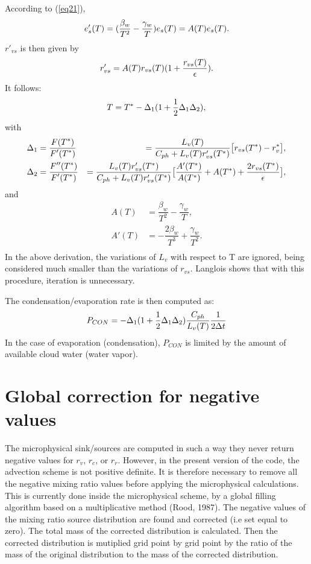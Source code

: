 According to (\ref{eq21}),
\begin{equation}
e_s'(T)= ( {\beta_w \over T^2} - {\gamma_w \over T}) e_s(T) = A(T) e_s(T).
\end{equation}
$r'_{vs}$ is then given by
\begin{equation}
r'_{vs} = A(T) r_{vs}(T)(1 + {r_{vs}(T) \over \epsilon}).
\end{equation}
It follows:
\begin{equation}
T= T^* - \Delta_1 (1 +{1\over 2} \Delta_1 \Delta_2),
\end{equation}
with
\begin{eqnarray}
\Delta_1&= \dfrac {F(T^*)}{ F'(T^*)}&= {L_v(T) \over C_{ph} + L_v(T)r'_{vs}(T^*)}
         \big[r_{vs}(T^*)-r_v^*\big], \\
\Delta_2&= \dfrac {F''(T^*)}{F'(T^*)}&= {L_v(T) r'_{vs}(T^*) \over C_{ph} + L_v(T) r'_{vs}(T^*)}
         \big[ {A'(T^*) \over A(T^*)} + A(T^*) +
{2 r_{vs}(T^*) \over \epsilon}\big] ,
\end{eqnarray}
and
\begin{eqnarray}
A(T)&=\dfrac{\beta_w}{T^2} - \dfrac{\gamma_w}{T}, \\
A'(T)&=-\dfrac{2\beta_w}{T^3} + \dfrac{\gamma_w}{T^2}. \\
\end{eqnarray}
In the above derivation, the variations of $L_v$ with respect to T are ignored,
being considered much smaller than the variations of $r_{vs}$. Langlois shows
that with this procedure, iteration is unnecessary.

The condensation/evaporation rate is then computed as:
\begin{equation}
P_{CON}= - \Delta_1 (1 +{1\over 2} \Delta_1 \Delta_2){C_{ph}\over L_v(T)}
{1 \over 2\Delta t}
\end{equation}
In the case of evaporation (condensation), $P_{CON}$ is limited by the amount
of available cloud water (water vapor).

\section{Global correction for negative values}
The microphysical sink/sources are computed in such a way they never return
negative values for $r_v$, $r_c$, or $r_r$.
However, in the present version of the code, the advection
scheme is not positive definite. It is therefore necessary to remove all the
negative mixing ratio values before applying the microphysical calculations.
This is currently done inside the microphysical scheme,
by a global filling algorithm based on a multiplicative method
(Rood, 1987). The
negative values of the mixing ratio source distribution are found and
corrected (i.e set equal to zero). The total mass of the corrected distribution
is calculated. Then the corrected distribution is mutiplied grid point by
grid point by the ratio of the mass of the original distribution to the mass of
the corrected distribution.

